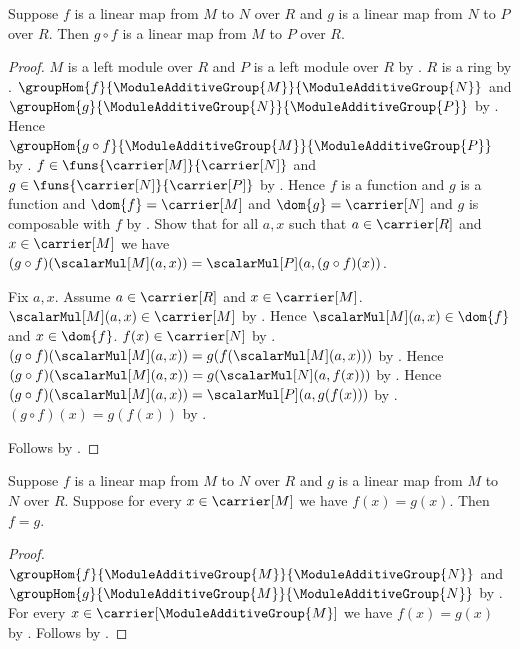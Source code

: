 \begin{theorem}\label{linear_map_composition}
    Suppose $f$ is a linear map from $M$ to $N$ over $R$ and
        $g$ is a linear map from $N$ to $P$ over $R$.
    Then $g\circ f$ is a linear map from $M$ to $P$ over $R$.
\end{theorem}
\begin{proof}
    $M$ is a left module over $R$ and
        $P$ is a left module over $R$ by
        .
    $R$ is a ring by .
    $\groupHom{f}{\ModuleAdditiveGroup{M}}{
        \ModuleAdditiveGroup{N}}$ and
        $\groupHom{g}{\ModuleAdditiveGroup{N}}{
        \ModuleAdditiveGroup{P}}$ by
        .
    Hence $\groupHom{g\circ f}{\ModuleAdditiveGroup{M}}{
        \ModuleAdditiveGroup{P}}$ by
        .
    $f\in\funs{\carrier[M]}{\carrier[N]}$ and
        $g\in\funs{\carrier[N]}{\carrier[P]}$ by
        .
    Hence $f$ is a function and $g$ is a function and
        $\dom{f}=\carrier[M]$ and $\dom{g}=\carrier[N]$ and
        $g$ is composable with $f$ by
        .
    Show that for all $a,x$ such that $a\in\carrier[R]$ and
        $x\in\carrier[M]$ we have
        $(g\circ f)(\scalarMul[M](a,x))
            =\scalarMul[P](a,(g\circ f)(x))$.
    \begin{subproof}
        Fix $a,x$.
        Assume $a\in\carrier[R]$ and $x\in\carrier[M]$.
        $\scalarMul[M](a,x)\in\carrier[M]$ by
            .
        Hence $\scalarMul[M](a,x)\in\dom{f}$ and $x\in\dom{f}$.
        $f(x)\in\carrier[N]$ by .
        $(g\circ f)(\scalarMul[M](a,x))
            =g(f(\scalarMul[M](a,x)))$ by .
        Hence $(g\circ f)(\scalarMul[M](a,x))
            =g(\scalarMul[N](a,f(x)))$ by
            .
        Hence $(g\circ f)(\scalarMul[M](a,x))
            =\scalarMul[P](a,g(f(x)))$ by
            .
        $(g\circ f)(x)=g(f(x))$ by .
    \end{subproof}
    Follows by .
\end{proof}

\begin{theorem}\label{linear_map_extensionality}
    Suppose $f$ is a linear map from $M$ to $N$ over $R$ and
        $g$ is a linear map from $M$ to $N$ over $R$.
    Suppose for every $x\in\carrier[M]$ we have $f(x)=g(x)$.
    Then $f=g$.
\end{theorem}
\begin{proof}
    $\groupHom{f}{\ModuleAdditiveGroup{M}}{
        \ModuleAdditiveGroup{N}}$ and
        $\groupHom{g}{\ModuleAdditiveGroup{M}}{
        \ModuleAdditiveGroup{N}}$ by
        .
    For every $x\in\carrier[\ModuleAdditiveGroup{M}]$ we have
        $f(x)=g(x)$ by .
    Follows by .
\end{proof}

